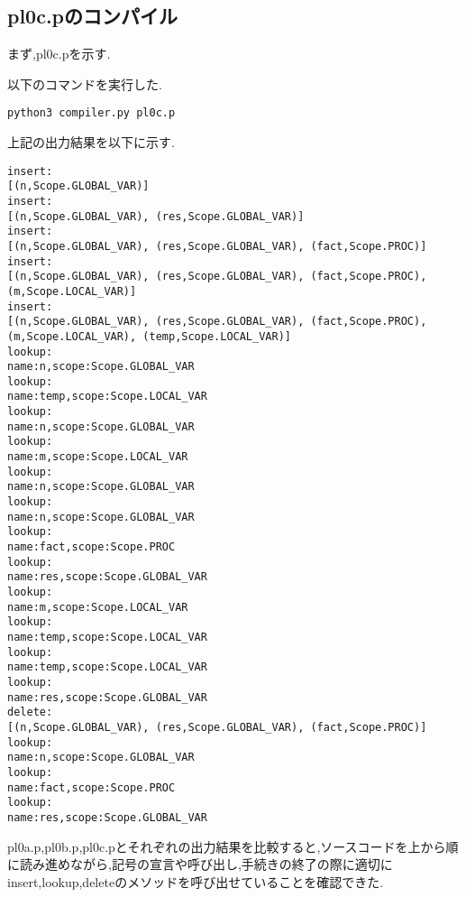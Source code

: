 \documentclass[main]{subfiles}
\begin{document}
\subsection{pl0c.pのコンパイル}
まず,pl0c.pを示す.

以下のコマンドを実行した.
\begin{oframed}
\begin{verbatim}
python3 compiler.py pl0c.p
\end{verbatim}
\end{oframed}
上記の出力結果を以下に示す.
\begin{lstlisting}[caption=python3 compiler.py pl0c.pの出力]
insert:
[(n,Scope.GLOBAL_VAR)]
insert:
[(n,Scope.GLOBAL_VAR), (res,Scope.GLOBAL_VAR)]
insert:
[(n,Scope.GLOBAL_VAR), (res,Scope.GLOBAL_VAR), (fact,Scope.PROC)]
insert:
[(n,Scope.GLOBAL_VAR), (res,Scope.GLOBAL_VAR), (fact,Scope.PROC), (m,Scope.LOCAL_VAR)]
insert:
[(n,Scope.GLOBAL_VAR), (res,Scope.GLOBAL_VAR), (fact,Scope.PROC), (m,Scope.LOCAL_VAR), (temp,Scope.LOCAL_VAR)]
lookup:
name:n,scope:Scope.GLOBAL_VAR
lookup:
name:temp,scope:Scope.LOCAL_VAR
lookup:
name:n,scope:Scope.GLOBAL_VAR
lookup:
name:m,scope:Scope.LOCAL_VAR
lookup:
name:n,scope:Scope.GLOBAL_VAR
lookup:
name:n,scope:Scope.GLOBAL_VAR
lookup:
name:fact,scope:Scope.PROC
lookup:
name:res,scope:Scope.GLOBAL_VAR
lookup:
name:m,scope:Scope.LOCAL_VAR
lookup:
name:temp,scope:Scope.LOCAL_VAR
lookup:
name:temp,scope:Scope.LOCAL_VAR
lookup:
name:res,scope:Scope.GLOBAL_VAR
delete:
[(n,Scope.GLOBAL_VAR), (res,Scope.GLOBAL_VAR), (fact,Scope.PROC)]
lookup:
name:n,scope:Scope.GLOBAL_VAR
lookup:
name:fact,scope:Scope.PROC
lookup:
name:res,scope:Scope.GLOBAL_VAR
\end{lstlisting}

pl0a.p,pl0b.p,pl0c.pとそれぞれの出力結果を比較すると,ソースコードを上から順に読み進めながら,記号の宣言や呼び出し,手続きの終了の際に適切にinsert,lookup,deleteのメソッドを呼び出せていることを確認できた.
\end{document}
